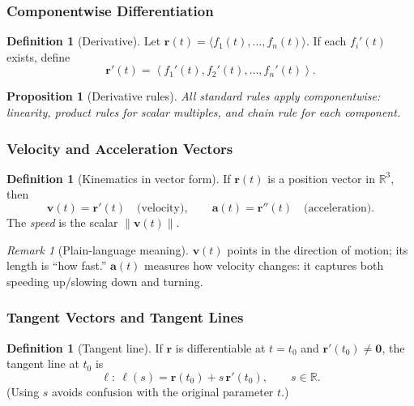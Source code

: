 \documentclass[12pt]{article}
\numberwithin{equation}{section}
\newcommand{\RR}{\mathbb{R}}
\newcommand{\vect}[1]{\boldsymbol{#1}}   %
\newcommand{\norm}[1]{\left\lVert #1\right\rVert}
\theoremstyle{plain}
\newtheorem{proposition}[theorem]{Proposition}
\theoremstyle{definition}
\newtheorem{definition}[theorem]{Definition}
\theoremstyle{remark}
\newtheorem{remark}[theorem]{Remark}
\begin{document}
\subsubsection{Componentwise Differentiation}

\begin{definition}[Derivative]\label{def:vvf-derivative}
Let $\vect r(t)=\langle f_1(t),\dots,f_n(t)\rangle$. If each $f_i'(t)$ exists, define
\[
\vect r'(t)=\left\langle f_1'(t),f_2'(t),\dots,f_n'(t)\right\rangle.
\]
\end{definition}

\begin{proposition}[Derivative rules]
All standard rules apply componentwise: linearity, product rules for scalar multiples, and chain rule for each component.
\end{proposition}

\subsubsection{Velocity and Acceleration Vectors}

\begin{definition}[Kinematics in vector form]\label{def:kinematics}
If $\vect r(t)$ is a position vector in $\RR^3$, then
\[
\vect v(t)=\vect r'(t)\quad \text{(velocity)},\qquad
\vect a(t)=\vect r''(t)\quad \text{(acceleration)}.
\]
The \emph{speed} is the scalar $\norm{\vect v(t)}$.
\end{definition}

\begin{remark}[Plain-language meaning]
$\vect v(t)$ points in the direction of motion; its length is “how fast.” $\vect a(t)$ measures how velocity changes: it captures both speeding up/slowing down and turning.
\end{remark}

\subsubsection{Tangent Vectors and Tangent Lines}

\begin{definition}[Tangent line]\label{def:tangent-line}
If $\vect r$ is differentiable at $t=t_0$ and $\vect r'(t_0)\neq\vect 0$, the tangent line at $t_0$ is
\[
\ell:\ \vect \ell(s)=\vect r(t_0)+s\,\vect r'(t_0),\qquad s\in\RR.
\]
(Using $s$ avoids confusion with the original parameter $t$.)
\end{definition}
\end{document}
